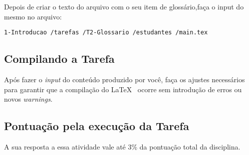 Depois de criar o texto do arquivo com o seu item de glossário,faça o input do mesmo no arquivo:
\begin{verbatim}
1-Introducao /tarefas /T2-Glossario /estudantes /main.tex
\end{verbatim}

\subsection{Compilando a Tarefa}

Após fazer o \textit{input} do conteúdo produzido por você, faça os ajustes necessários para garantir que a compilação do \LaTeX~ ocorre sem introdução de erros ou novos \textit{warnings}.

\subsection{Pontuação pela execução da  Tarefa}

A sua resposta a essa atividade vale até 3\% da pontuação total da disciplina.
